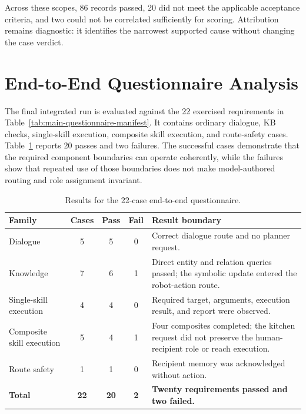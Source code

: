 Across these scopes, 86 records passed, 20 did not meet the applicable acceptance criteria, and two could not be correlated sufficiently for scoring. Attribution remains diagnostic: it identifies the narrowest supported cause without changing the case verdict.

\section{End-to-End Questionnaire Analysis}

The final integrated run is evaluated against the 22 exercised requirements in Table~\ref{tab:main-questionnaire-manifest}. It contains ordinary dialogue, KB checks, single-skill execution, composite skill execution, and route-safety cases. Table~\ref{tab:final-questionnaire-summary} reports 20 passes and two failures. The successful cases demonstrate that the required component boundaries can operate coherently, while the failures show that repeated use of those boundaries does not make model-authored routing and role assignment invariant.

\begin{table}[H]
\centering
\small
\renewcommand{\arraystretch}{1.14}
\caption{Results for the 22-case end-to-end questionnaire.}
\label{tab:final-questionnaire-summary}
\begin{tabularx}{\textwidth}{@{}>{\RaggedRight\arraybackslash}p{}ccc>{\RaggedRight\arraybackslash}X@{}}
\toprule
\textbf{Family} & \textbf{Cases} & \textbf{Pass} & \textbf{Fail} & \textbf{Result boundary}\\
\midrule
Dialogue & 5 & 5 & 0 & Correct dialogue route and no planner request.\\
Knowledge & 7 & 6 & 1 & Direct entity and relation queries passed; the symbolic update entered the robot-action route.\\
Single-skill execution & 4 & 4 & 0 & Required target, arguments, execution result, and report were observed.\\
Composite skill execution & 5 & 4 & 1 & Four composites completed; the kitchen request did not preserve the human-recipient role or reach execution.\\
Route safety & 1 & 1 & 0 & Recipient memory was acknowledged without action.\\
\midrule
\textbf{Total} & \textbf{22} & \textbf{20} & \textbf{2} & \textbf{Twenty requirements passed and two failed.}\\
\bottomrule
\end{tabularx}
\end{table}

